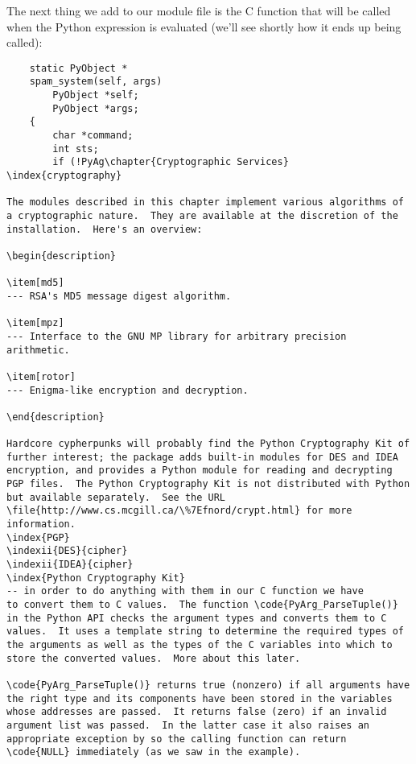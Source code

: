 The next thing we add to our module file is the C function that will
be called when the Python expression 
is evaluated (we'll see shortly how it ends up being called):

\begin{verbatim}
    static PyObject *
    spam_system(self, args)
        PyObject *self;
        PyObject *args;
    {
        char *command;
        int sts;
        if (!PyA g\chapter{Cryptographic Services}
\index{cryptography}

The modules described in this chapter implement various algorithms of
a cryptographic nature.  They are available at the discretion of the
installation.  Here's an overview:

\begin{description}

\item[md5]
--- RSA's MD5 message digest algorithm.

\item[mpz]
--- Interface to the GNU MP library for arbitrary precision arithmetic.

\item[rotor]
--- Enigma-like encryption and decryption.

\end{description}

Hardcore cypherpunks will probably find the Python Cryptography Kit of
further interest; the package adds built-in modules for DES and IDEA
encryption, and provides a Python module for reading and decrypting
PGP files.  The Python Cryptography Kit is not distributed with Python
but available separately.  See the URL
\file{http://www.cs.mcgill.ca/\%7Efnord/crypt.html} for more information.
\index{PGP}
\indexii{DES}{cipher}
\indexii{IDEA}{cipher}
\index{Python Cryptography Kit}
-- in order to do anything with them in our C function we have
to convert them to C values.  The function \code{PyArg_ParseTuple()}
in the Python API checks the argument types and converts them to C
values.  It uses a template string to determine the required types of
the arguments as well as the types of the C variables into which to
store the converted values.  More about this later.

\code{PyArg_ParseTuple()} returns true (nonzero) if all arguments have
the right type and its components have been stored in the variables
whose addresses are passed.  It returns false (zero) if an invalid
argument list was passed.  In the latter case it also raises an
appropriate exception by so the calling function can return
\code{NULL} immediately (as we saw in the example).



\end{verbatim}
